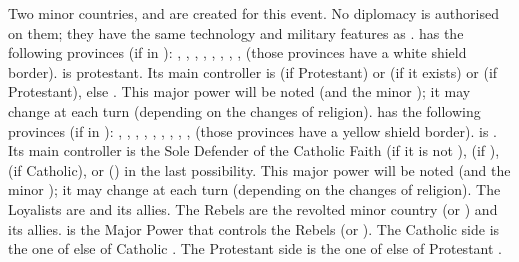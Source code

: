 \phevnt
{} Two minor countries, \paysHuguenots and
\paysLigue are created for this event. No diplomacy is authorised on them;
they have the same technology and military features as \FRA.
\bparag \hug has the following provinces (if in \FRA): \provinceCaux,
\provinceTouraine, \provincePoitou, \provinceQuercy, \provinceGuyenne,
\provinceLanguedoc, \provinceBearn, \provinceDauphine, \provinceCevennes
(those provinces have a white shield border).
\bparag \hug is protestant.
\bparag Its main controller is \ENG (if Protestant) or \HOL (if it exists) or
\SUE (if Protestant), else \MAJHOL. This major power will be noted \HUG (and
the minor \hug); it may change at each turn (depending on the changes of
religion).
\aparag[La Ligue]
\bparag \lig has the following provinces (if in \FRA):
\provinceNormandie, \provinceMaine, ,
\provinceOrleanais, \provincePicardie, \provinceChampagne, \provinceBerry,
\provinceBourgogne, \provinceLyonnais, \provinceProvence (those provinces have
a yellow shield border).
\bparag \lig is \CATHCR.
\bparag Its main controller is the Sole Defender of the Catholic Faith (if it
is not \FRA), \SPA (if \CATHCR), \ENG (if Catholic), or \SPA (\CATHCO) in the
last possibility.  This major power will be noted \LIG (and the minor \lig);
it may change at each turn (depending on the changes of religion).
\aparag The Loyalists are \FRA and its allies. The Rebels are the revolted
minor country (\lig or \hug) and its allies. \REB is the Major Power that
controls the Rebels (\LIG or \HUG).
\aparag The Catholic side is the one of \lig else of Catholic \FRA.
\aparag The Protestant side is the one of \hug else of Protestant \FRA.

